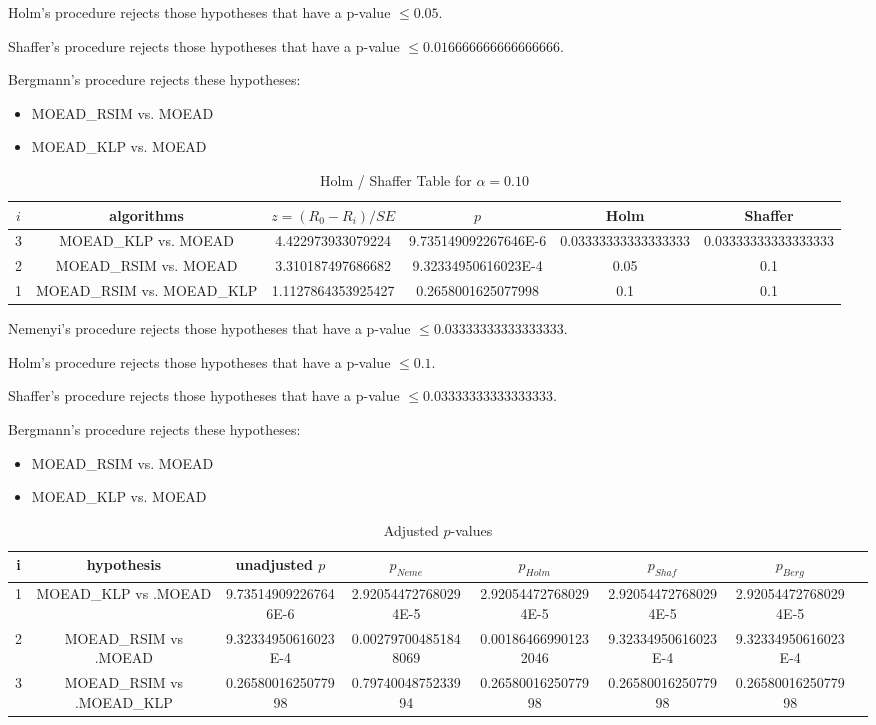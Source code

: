 \documentclass[a4paper,10pt]{article}
\begin{document}
\begin{landscape}
Holm's procedure rejects those hypotheses that have a p-value $\le0.05$.


Shaffer's procedure rejects those hypotheses that have a p-value $\le0.016666666666666666$.


Bergmann's procedure rejects these hypotheses:


\begin{itemize}


\item MOEAD_RSIM vs. MOEAD
\item MOEAD_KLP vs. MOEAD
\end{itemize}


\begin{table}[!htp]
\centering\tiny
\caption{Holm / Shaffer Table for $\alpha=0.10$}
\begin{tabular}{cccccc}
$i$&algorithms&$z=(R_0 - R_i)/SE$&$p$&Holm&Shaffer\\
\hline
3&MOEAD_KLP vs. MOEAD&4.422973933079224&9.735149092267646E-6&0.03333333333333333&0.03333333333333333\\
2&MOEAD_RSIM vs. MOEAD&3.310187497686682&9.32334950616023E-4&0.05&0.1\\
1&MOEAD_RSIM vs. MOEAD_KLP&1.1127864353925427&0.2658001625077998&0.1&0.1\\
\hline
\end{tabular}
\end{table}
Nemenyi's procedure rejects those hypotheses that have a p-value $\le0.03333333333333333$.


Holm's procedure rejects those hypotheses that have a p-value $\le0.1$.


Shaffer's procedure rejects those hypotheses that have a p-value $\le0.03333333333333333$.


Bergmann's procedure rejects these hypotheses:


\begin{itemize}


\item MOEAD_RSIM vs. MOEAD
\item MOEAD_KLP vs. MOEAD
\end{itemize}


\begin{table}[!htp]
\centering\tiny
\caption{Adjusted $p$-values}
\begin{tabular}{cccccccc}
i&hypothesis&unadjusted $p$&$p_{Neme}$&$p_{Holm}$&$p_{Shaf}$&$p_{Berg}$\\
\hline
1&MOEAD_KLP vs .MOEAD&9.735149092267646E-6&2.920544727680294E-5&2.920544727680294E-5&2.920544727680294E-5&2.920544727680294E-5\\
2&MOEAD_RSIM vs .MOEAD&9.32334950616023E-4&0.002797004851848069&0.001864669901232046&9.32334950616023E-4&9.32334950616023E-4\\
3&MOEAD_RSIM vs .MOEAD_KLP&0.2658001625077998&0.7974004875233994&0.2658001625077998&0.2658001625077998&0.2658001625077998\\
\hline
\end{tabular}
\end{table}

\end{landscape}
\end{document}
